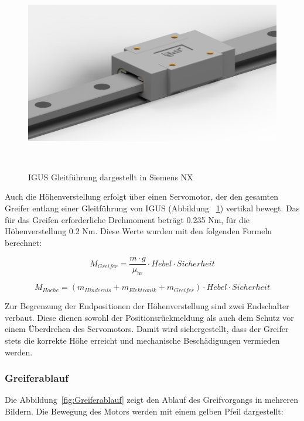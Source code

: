 \documentclass[main.tex]{subfiles} %
\begin{document}
\begin{figure}[H]
    \centering
    \includegraphics[width = 0.65\linewidth]{./fig_Mechanik/IGUS.png}
    \caption{IGUS Gleitführung dargestellt in Siemens NX}~\label{fig:IGUS}
\end{figure}

Auch die Höhenverstellung erfolgt
über einen Servomotor, der den gesamten Greifer entlang einer Gleitführung von IGUS (Abbildung ~\ref{fig:IGUS}) vertikal bewegt.
Das für das Greifen erforderliche Drehmoment beträgt 0.235 $ \text{Nm}$,
für die Höhenverstellung 0.2 $\text{Nm}$. Diese Werte wurden mit den folgenden Formeln berechnet:

\[
    M_{Greifer} = \frac{m \cdot g}{\mu_{\text{hr}}} \cdot Hebel \cdot Sicherheit
\]

\[
    M_{Hoehe} = (m_{Hindernis} + m_{Elektronik} + m_{Greifer}) \cdot Hebel \cdot Sicherheit
\]


\newpage

Zur Begrenzung der Endpositionen der Höhenverstellung sind zwei Endschalter verbaut.  
Diese dienen sowohl der Positionsrückmeldung als auch dem Schutz vor einem Überdrehen des Servomotors.  
Damit wird sichergestellt, dass der Greifer stets die korrekte Höhe erreicht und mechanische Beschädigungen vermieden werden.

\subsubsection*{Greiferablauf}

Die Abbildung~\ref{fig:Greiferablauf} zeigt den Ablauf des Greifvorgangs in mehreren Bildern.
Die Bewegung des Motors werden mit einem gelben Pfeil dargestellt:
\end{document}
